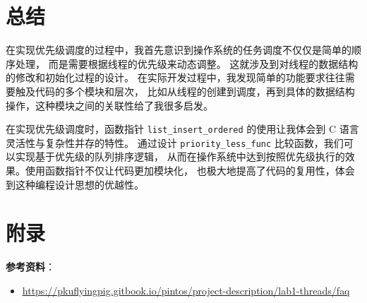 \section{总结}
在实现优先级调度的过程中，我首先意识到操作系统的任务调度不仅仅是简单的顺序处理，
而是需要根据线程的优先级来动态调整。
这就涉及到对线程的数据结构的修改和初始化过程的设计。
在实际开发过程中，我发现简单的功能要求往往需要触及代码的多个模块和层次，
比如从线程的创建到调度，再到具体的数据结构操作，这种模块之间的关联性给了我很多启发。

在实现优先级调度时，函数指针 \texttt{list\_insert\_ordered} 的使用让我体会到 C 语言灵活性与复杂性并存的特性。
通过设计 \texttt{priority\_less\_func} 比较函数，我们可以实现基于优先级的队列排序逻辑，
从而在操作系统中达到按照优先级执行的效果。使用函数指针不仅让代码更加模块化，
也极大地提高了代码的复用性，体会到这种编程设计思想的优越性。

\section{附录}

\textbf{参考资料}：

\begin{itemize}
    \item \href{https://pkuflyingpig.gitbook.io/pintos/project-description/lab1-threads/faq}{\underline{https://pkuflyingpig.gitbook.io/pintos/project-description/lab1-threads/faq}}
\end{itemize}

